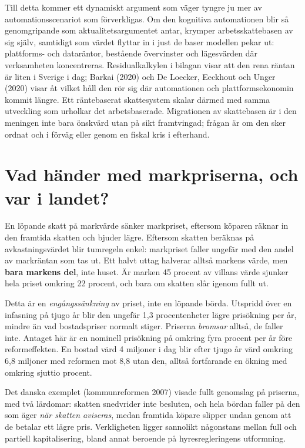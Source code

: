 \documentclass[11pt]{article}
\begin{document}
Till detta kommer ett dynamiskt argument som väger tyngre ju mer av automationsscenariot som förverkligas. Om den kognitiva automationen blir så genomgripande som aktualitetsargumentet antar, krymper arbetsskattebasen av sig själv, samtidigt som värdet flyttar in i just de baser modellen pekar ut: plattforms- och dataräntor, bestående övervinster och lägesvärden där verksamheten koncentreras. Residualkalkylen i bilagan visar att den rena räntan är liten i Sverige i dag; Barkai (2020) och De Loecker, Eeckhout och Unger (2020) visar åt vilket håll den rör sig där automationen och plattformsekonomin kommit längre. Ett räntebaserat skattesystem skalar därmed med samma utveckling som urholkar det arbetsbaserade. Migrationen av skattebasen är i den meningen inte bara önskvärd utan på sikt framtvingad; frågan är om den sker ordnat och i förväg eller genom en fiskal kris i efterhand.

\section{Vad händer med markpriserna, och var i landet?}

En löpande skatt på markvärde sänker markpriset, eftersom köparen räknar in den framtida skatten och bjuder lägre. Eftersom skatten beräknas på avkastningsvärdet blir tumregeln enkel: markpriset faller ungefär med den andel av markräntan som tas ut. Ett halvt uttag halverar alltså markens värde, men \textbf{bara markens del}, inte huset. Är marken 45 procent av villans värde sjunker hela priset omkring 22 procent, och bara om skatten slår igenom fullt ut.

Detta är en \emph{engångssänkning} av priset, inte en löpande börda. Utspridd över en infasning på tjugo år blir den ungefär 1,3 procentenheter lägre prisökning per år, mindre än vad bostadspriser normalt stiger. Priserna \emph{bromsar} alltså, de faller inte. Antaget här är en nominell prisökning på omkring fyra procent per år före reformeffekten. En bostad värd 4 miljoner i dag blir efter tjugo år värd omkring 6,8 miljoner med reformen mot 8,8 utan den, alltså fortfarande en ökning med omkring sjuttio procent.

Det danska exemplet (kommunreformen 2007) visade fullt genomslag på priserna, med två lärdomar: skatten snedvrider inte besluten, och hela bördan faller på den som äger \emph{när skatten aviseras}, medan framtida köpare slipper undan genom att de betalar ett lägre pris. Verkligheten ligger sannolikt någonstans mellan full och partiell kapitalisering, bland annat beroende på hyresregleringens utformning.
\end{document}
